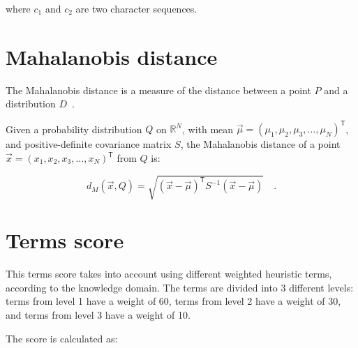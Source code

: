 \documentclass[a4paper, 12pt]{book}
\begin{document}
where $c_{1}$ and $c_{2}$ are two character sequences.

\section{Mahalanobis distance}
\label{sec:mahalanobis-definition}

The Mahalanobis distance is a measure of the distance between a point \(P\) and a distribution \(D\)~\cite{mclachlan1999mahalanobis}.

Given a probability distribution $Q$ on \(\mathbb{R} ^{N}\), with mean $\vec {\mu}=(\mu_{1},\mu_{2},\mu_{3}, \dots, \mu_{N})^{\mathsf {T}}$, and positive-definite covariance matrix $S$, the Mahalanobis distance of a point $\vec {x}=(x_{1},x_{2},x_{3},\dots ,x_{N})^{\mathsf {T}}$ from $Q$ is:


\begin{center}
    \begin{equation}
    d_{M}({\vec {x}},Q)={\sqrt {({\vec {x}}-{\vec {\mu }})^{\mathsf {T}}S^{-1}({\vec {x}}-{\vec {\mu }})}} \quad .
    \end{equation}
\end{center}


\section{Terms score}
\label{sec:terms-score-definition}

This terms score takes into account using different weighted heuristic terms, according to the knowledge domain. The terms are divided into 3 different levels: terms from level 1 have a weight of 60, terms from level 2 have a weight of 30, and terms from level 3 have a weight of 10. 


The score is calculated as: 


\end{document}
